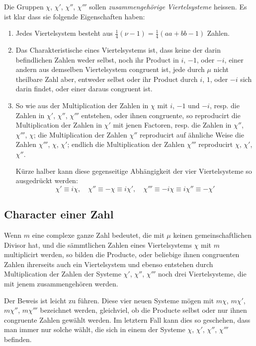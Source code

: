 \documentclass[12pt,a4paper]{article}
\begin{document}
Die Gruppen $\chi$, $\chi'$, $\chi''$, $\chi'''$ sollen \emph{zusammengehörige Viertelsysteme} heissen. Es ist klar dass sie folgende Eigenschaften haben:

\begin{enumerate}
\item Jedes Viertelsystem besteht aus $\frac{1}{4}(\nu - 1) = \frac{1}{4}(aa + bb - 1)$ Zahlen.

\item Das Charakteristische eines Viertelsystems ist, dass keine der darin befindlichen Zahlen weder selbst, noch ihr Product in $i$, $-1$, oder $-i$, einer andern aus demselben Viertelsystem congruent ist, jede durch $\mu$ nicht theilbare Zahl aber, entweder selbst oder ihr Product durch $i$, $1$, oder $-i$ sich darin findet, oder einer daraus congruent ist.

\item So wie aus der Multiplication der Zahlen in $\chi$ mit $i$, $-1$ und $-i$, resp. die Zahlen in $\chi'$, $\chi''$, $\chi'''$ entstehen, oder ihnen congruente, so reproducirt die Multiplication der Zahlen in $\chi'$ mit jenen Factoren, resp. die Zahlen in $\chi''$, $\chi'''$, $\chi$; die Multiplication der Zahlen $\chi''$ reproducirt auf ähnliche Weise die Zahlen $\chi'''$, $\chi$, $\chi'$; endlich die Multiplication der Zahlen $\chi'''$ reproducirt $\chi$, $\chi'$, $\chi''$. 

Kürze halber kann diese gegenseitige Abhängigkeit der vier Viertelsysteme so ausgedrückt werden:
\[
\chi' \equiv i\chi, \quad \chi'' \equiv -\chi \equiv i\chi', \quad \chi''' \equiv -i\chi \equiv i\chi'' \equiv -\chi'
\]
\end{enumerate}

\subsection*{Character einer Zahl}

Wenn $m$ eine complexe ganze Zahl bedeutet, die mit $\mu$ keinen gemeinschaftlichen Divisor hat, und die sämmtlichen Zahlen eines Viertelsystems $\chi$ mit $m$ multiplicirt werden, so bilden die Producte, oder beliebige ihnen congruenten Zahlen ihrerseits auch ein Viertelsystem und ebenso entstehen durch Multiplication der Zahlen der Systeme $\chi'$, $\chi''$, $\chi'''$ noch drei Viertelsysteme, die mit jenem zusammengehören werden.

Der Beweis ist leicht zu führen. Diese vier neuen Systeme mögen mit $m\chi$, $m\chi'$, $m\chi''$, $m\chi'''$ bezeichnet werden, gleichviel, ob die Producte selbst oder nur ihnen congruente Zahlen gewählt werden. Im letztern Fall kann dies so geschehen, dass man immer nur solche wählt, die sich in einem der Systeme $\chi$, $\chi'$, $\chi''$, $\chi'''$ befinden.
\end{document}
